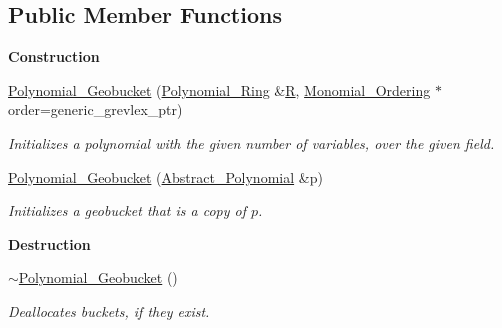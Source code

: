 \subsection*{Public Member Functions}
\begin{Indent}\textbf{ Construction}\par
\begin{DoxyCompactItemize}
\item 
\mbox{\label{class_polynomial___geobucket_a1ddbd2520d7fa5b27ef27c66833fe074}} 
\hyperlink{class_polynomial___geobucket_a1ddbd2520d7fa5b27ef27c66833fe074}{Polynomial\+\_\+\+Geobucket} (\hyperlink{class_polynomial___ring}{Polynomial\+\_\+\+Ring} \&\hyperlink{class_abstract___polynomial_a551ade20b7dcd96c227dd0401f6ffbbe}{R}, \hyperlink{class_monomial___ordering}{Monomial\+\_\+\+Ordering} $\ast$order=generic\+\_\+grevlex\+\_\+ptr)
\begin{DoxyCompactList}\small\item\em Initializes a polynomial with the given number of variables, over the given field. \end{DoxyCompactList}\item 
\mbox{\label{class_polynomial___geobucket_a220910eae57ee32ec35a56344e3297b6}} 
\hyperlink{class_polynomial___geobucket_a220910eae57ee32ec35a56344e3297b6}{Polynomial\+\_\+\+Geobucket} (\hyperlink{class_abstract___polynomial}{Abstract\+\_\+\+Polynomial} \&p)
\begin{DoxyCompactList}\small\item\em Initializes a geobucket that is a copy of $p$. \end{DoxyCompactList}\end{DoxyCompactItemize}
\end{Indent}
\begin{Indent}\textbf{ Destruction}\par
\begin{DoxyCompactItemize}
\item 
\mbox{\label{class_polynomial___geobucket_aa943e78f99a7e6d61ed5d962f05d34b1}} 
\hyperlink{class_polynomial___geobucket_aa943e78f99a7e6d61ed5d962f05d34b1}{$\sim$\+Polynomial\+\_\+\+Geobucket} ()
\begin{DoxyCompactList}\small\item\em Deallocates buckets, if they exist. \end{DoxyCompactList}\end{DoxyCompactItemize}
\end{Indent}
